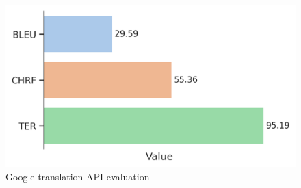 \documentclass{article}
\begin{document}
\begin{figure}
	\centering
	\includegraphics[width=\linewidth, ]{figs/Google_translate_api} %
	\caption{ Google translation API evaluation}
	
	\label{fig:duck}
\end{figure}






%
%
%
%
%
	
\end{document}
